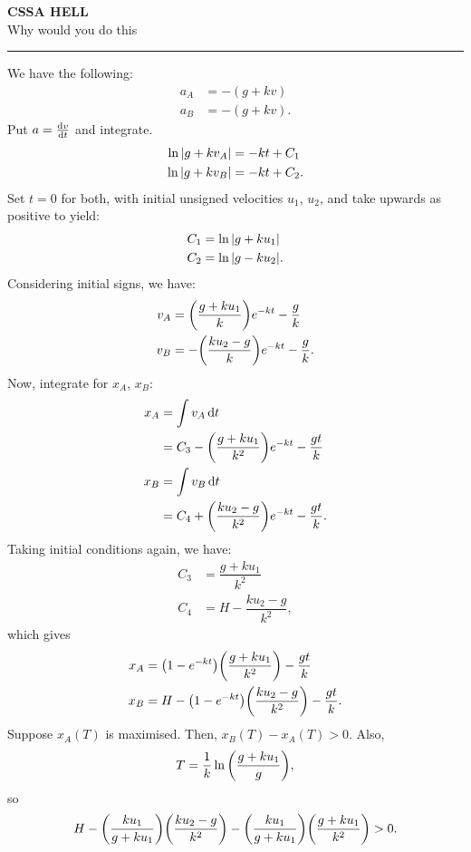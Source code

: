 \documentclass[12pt]{article}
\begin{document}
\begin{center}
	{\Large \textbf{CSSA HELL}} \\
	Why would you do this
	\rule{\textwidth}{1pt}
\end{center}

We have the following:
\begin{align*}
	a_A & = -(g+kv) \\
	a_B & = -(g+kv).
\end{align*}
Put $a = \dv{v}{t}$ and integrate.
\begin{align*}
	\ln\abs{g+kv_A} & = -kt + C_1  \\
	\ln\abs{g+kv_B} & = -kt + C_2.
\end{align*}
Set $t=0$ for both, with initial unsigned velocities $u_1$, $u_2$, and take upwards as positive to yield:
\begin{align*}
  C_1 & = \ln\abs{g+ku_1} \\
  C_2 & = \ln\abs{g-ku_2}.
\end{align*}
Considering initial signs, we have:
\begin{align*}
	v_A & = \qty(\dfrac{g+ku_1}{k})e^{-kt} - \dfrac{g}{k}   \\
	v_B & = -\qty(\dfrac{ku_2-g}{k})e^{-kt} - \dfrac{g}{k}.
\end{align*}
Now, integrate for $x_A$, $x_B$:
\begin{align*}
	x_A & = \int v_A \dd{t}                                         \\
	    & = C_3 - \qty(\dfrac{g+ku_1}{k^2})e^{-kt} - \dfrac{gt}{k}  \\
	x_B & = \int v_B \dd{t}                                         \\
	    & = C_4 + \qty(\dfrac{ku_2-g}{k^2})e^{-kt} - \dfrac{gt}{k}.
\end{align*}
Taking initial conditions again, we have:
\begin{align*}
	C_3 & = \dfrac{g+ku_1}{k^2}    \\
	C_4 & = H-\dfrac{ku_2-g}{k^2},
\end{align*}
which gives
\begin{align*}
	x_A & = \qty(1-e^{-kt})\qty(\dfrac{g+ku_1}{k^2}) - \dfrac{gt}{k}      \\
	x_B & = H - \qty(1-e^{-kt})\qty(\dfrac{ku_2-g}{k^2}) - \dfrac{gt}{k}.
\end{align*}
\newpage
Suppose $x_A(T)$ is maximised. Then, $x_B(T) - x_A(T) > 0$.
Also,
\[T = \dfrac{1}{k}\ln\qty(\dfrac{g+ku_1}{g}),\]
so
\[  H - \qty(\dfrac{ku_1}{g+ku_1})\qty(\dfrac{ku_2-g}{k^2}) - \qty(\dfrac{ku_1}{g+ku_1})\qty(\dfrac{g+ku_1}{k^2}) > 0.\]
\end{document}
